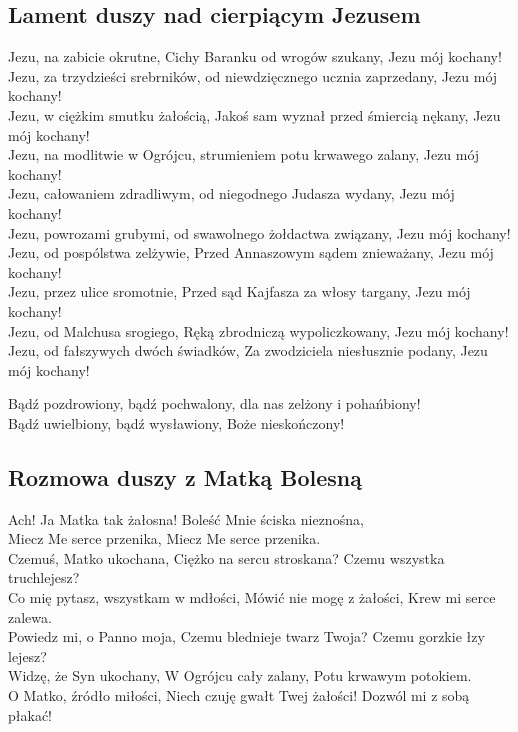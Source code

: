\subsection{Lament duszy nad cierpiącym Jezusem}

Jezu, na zabicie okrutne, Cichy Baranku od wrogów szukany, Jezu mój
kochany!\\
Jezu, za trzydzieści srebrników, od niewdzięcznego ucznia zaprzedany,
Jezu mój kochany!\\
Jezu, w ciężkim smutku żałością, Jakoś sam wyznał przed śmiercią nękany,
Jezu mój kochany!\\
Jezu, na modlitwie w Ogrójcu, strumieniem potu krwawego zalany, Jezu mój
kochany!\\
Jezu, całowaniem zdradliwym, od niegodnego Judasza wydany, Jezu mój
kochany!\\
Jezu, powrozami grubymi, od swawolnego żołdactwa związany, Jezu mój
kochany!\\
Jezu, od pospólstwa zelżywie, Przed Annaszowym sądem znieważany, Jezu
mój kochany!\\
Jezu, przez ulice sromotnie, Przed sąd Kajfasza za włosy targany, Jezu
mój kochany!\\
Jezu, od Malchusa srogiego, Ręką zbrodniczą wypoliczkowany, Jezu mój
kochany!\\
Jezu, od fałszywych dwóch świadków, Za zwodziciela niesłusznie podany,
Jezu mój kochany!

Bądź pozdrowiony, bądź pochwalony, dla nas zelżony i pohańbiony!\\
Bądź uwielbiony, bądź wysławiony, Boże nieskończony!


\subsection{Rozmowa duszy z Matką Bolesną}

Ach! Ja Matka tak żałosna! Boleść Mnie ściska nieznośna,\\
Miecz Me serce przenika, Miecz Me serce przenika.\\
Czemuś, Matko ukochana, Ciężko na sercu stroskana? Czemu wszystka
truchlejesz?\\
Co mię pytasz, wszystkam w mdłości, Mówić nie mogę z żałości, Krew mi
serce zalewa.\\
Powiedz mi, o Panno moja, Czemu blednieje twarz Twoja? Czemu gorzkie łzy
lejesz?\\
Widzę, że Syn ukochany, W Ogrójcu cały zalany, Potu krwawym potokiem.\\
O Matko, źródło miłości, Niech czuję gwałt Twej żałości! Dozwól mi z
sobą płakać!


